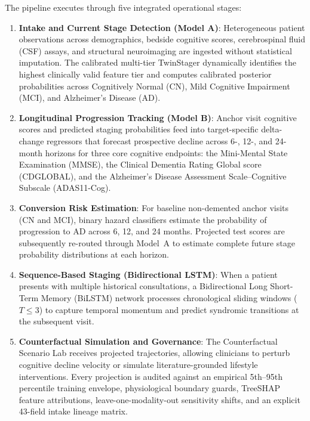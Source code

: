 The pipeline executes through five integrated operational stages:
\begin{enumerate}
    \item \textbf{Intake and Current Stage Detection (Model A)}: Heterogeneous patient observations across demographics, bedside cognitive scores, cerebrospinal fluid (CSF) assays, and structural neuroimaging are ingested without statistical imputation. The calibrated multi-tier TwinStager dynamically identifies the highest clinically valid feature tier and computes calibrated posterior probabilities across Cognitively Normal (CN), Mild Cognitive Impairment (MCI), and Alzheimer's Disease (AD).
    \item \textbf{Longitudinal Progression Tracking (Model B)}: Anchor visit cognitive scores and predicted staging probabilities feed into target-specific delta-change regressors that forecast prospective decline across 6-, 12-, and 24-month horizons for three core cognitive endpoints: the Mini-Mental State Examination (MMSE), the Clinical Dementia Rating Global score (CDGLOBAL), and the Alzheimer's Disease Assessment Scale--Cognitive Subscale (ADAS11-Cog).
    \item \textbf{Conversion Risk Estimation}: For baseline non-demented anchor visits (CN and MCI), binary hazard classifiers estimate the probability of progression to AD across 6, 12, and 24 months. Projected test scores are subsequently re-routed through Model~A to estimate complete future stage probability distributions at each horizon.
    \item \textbf{Sequence-Based Staging (Bidirectional LSTM)}: When a patient presents with multiple historical consultations, a Bidirectional Long Short-Term Memory (BiLSTM) network processes chronological sliding windows ($T \le 3$) to capture temporal momentum and predict syndromic transitions at the subsequent visit.
    \item \textbf{Counterfactual Simulation and Governance}: The Counterfactual Scenario Lab receives projected trajectories, allowing clinicians to perturb cognitive decline velocity or simulate literature-grounded lifestyle interventions. Every projection is audited against an empirical 5th--95th percentile training envelope, physiological boundary guards, TreeSHAP feature attributions, leave-one-modality-out sensitivity shifts, and an explicit 43-field intake lineage matrix.
\end{enumerate}

